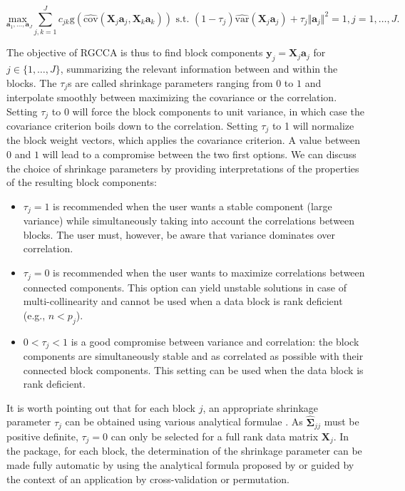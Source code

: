 \documentclass[
]{jss}
\begin{document}
\begin{equation}
\underset{\mathbf{a}_1, \ldots,\mathbf{a}_J}{\text{max }} \displaystyle \sum_{j, k = 1}^J c_{jk} \text{g}\left(\widehat{\text{cov}}\left(\mathbf{X}_j\mathbf{a}_j, \mathbf{X}_k\mathbf{a}_k\right)\right) 
\text{ s.t. } (1-\tau_j)\widehat{\text{var}}(\mathbf{X}_j\mathbf{a}_j) + \tau_j \Vert \mathbf{a}_j \Vert^2 = 1, j =1, \ldots, J. 
\label{optim_RGCCA_sample2}
\end{equation}

The objective of RGCCA is thus to find block components
\(\mathbf y_j =  \mathbf X_j  \mathbf a_j\) for
\(j \in \{1, \ldots, J\}\), summarizing the relevant information between
and within the blocks. The \(\tau_j\)s are called shrinkage parameters
ranging from \(0\) to \(1\) and interpolate smoothly between maximizing
the covariance or the correlation. Setting \(\tau_j\) to 0 will force
the block components to unit variance, in which case the covariance
criterion boils down to the correlation. Setting \(\tau_j\) to 1 will
normalize the block weight vectors, which applies the covariance
criterion. A value between \(0\) and \(1\) will lead to a compromise
between the two first options. We can discuss the choice of shrinkage
parameters by providing interpretations of the properties of the
resulting block components:

\begin{itemize}
\item   $\tau_j=1$ is recommended when the user wants a stable component (large variance) while simultaneously taking into account the correlations between blocks. The user must, however, be aware that variance dominates over correlation.

\item   $\tau_j=0$ is recommended when the user wants to maximize correlations between connected components. This option can yield unstable solutions in case of multi-collinearity and cannot be used when a data block is rank deficient (e.g., $n<p_j$).

\item   $0<\tau_j<1$ is a good compromise between variance and correlation: the block components are simultaneously stable and as correlated as possible with their connected block components. This setting can be used when the data block is rank deficient.
\end{itemize}

It is worth pointing out that for each block \(j\), an appropriate
shrinkage parameter \(\tau_j\) can be obtained using various analytical
formulae \citep[see][for instance]{Ledoit2004, Schafer2005, Chen2011}.
As \(\widehat{\mathbf{\Sigma}}_{jj}\) must be positive definite,
\(\tau_j = 0\) can only be selected for a full rank data matrix
\(\mathbf{X}_j\). In the  package, for each block, the
determination of the shrinkage parameter can be made fully automatic by
using the analytical formula proposed by \cite{Schafer2005} or guided by
the context of an application by cross-validation or permutation.
\end{document}

